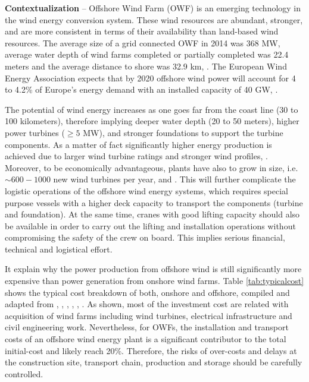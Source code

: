 \textbf{Contextualization} --
Offshore Wind Farm (OWF) is an emerging technology in the wind energy conversion system. These wind resources are abundant, stronger, and are more consistent in terms of their availability than land-based wind resources. The average size of a grid connected OWF in 2014 was 368 MW, average water depth of wind farms completed or partially completed was 22.4 meters and the average distance to shore was 32.9 km, \cite{Giorgio2015}. The European Wind Energy Association expects that by 2020 offshore wind power will account for 4 to 4.2\% of Europe's energy demand with an installed capacity of 40 GW,  \cite{EWEA2011, Kaldellis2013}.

The potential of wind energy increases as one goes far from the coast line (30 to 100 kilometers), therefore implying deeper water depth (20 to 50 meters), higher power turbines ($\geq 5$ MW), and stronger foundations to support the turbine components. As a matter of fact significantly higher energy production is achieved due to larger wind turbine ratings and stronger wind profiles, \cite{Sun2012298}. Moreover, to be economically advantageous, plants have also to grow in size, i.e. $\sim600-1000$ new wind turbines per year, \cite{EWEA2011} and \cite{Kaldellis2013}. This will further complicate the logistic operations of the offshore wind energy systems, which requires special purpose vessels with a higher deck capacity to transport the components (turbine and foundation). At the same time, cranes with good lifting capacity should also be available in order to carry out the lifting and installation operations without compromising the safety of the crew on board. This implies serious financial, technical and logistical effort.

It explain why the power production from offshore wind is still significantly more expensive than power generation from onshore wind farms. Table \ref{tab:typicalcost} shows the typical cost breakdown of both, onshore and offshore, compiled and adapted from \cite{Henderson2003}, \cite{Junginger2004},  \cite{UK10}, \cite{TCE12}, \cite{IRENA12}, \cite{Voormolen_2016}. As shown, most of the investment cost are related with acquisition of wind farms including wind turbines, electrical infrastructure and civil engineering work. Nevertheless, for OWFs, the installation and transport costs of an offshore wind energy plant is a significant contributor to the total initial-cost and likely reach 20\%. Therefore, the risks of over-costs and delays at the construction site, transport chain, production and storage should be carefully controlled.
